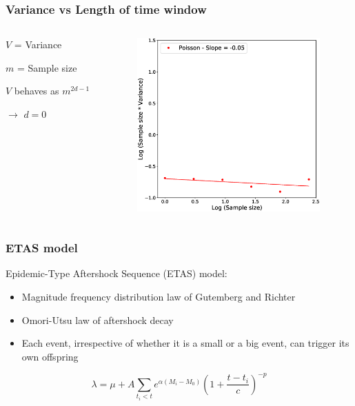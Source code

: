 \documentclass{beamer}
\begin{document}
	\begin{frame}
		\frametitle{Variance vs Length of time window}
		\begin{columns}[c]
			\begin{column}{4cm}
				$V$ = Variance

				\vspace{1em}

				$m$ = Sample size

				\vspace{1em}

				$V$ behaves as $m^{2 d - 1}$

				\vspace{1em}

				$\rightarrow$ $d =  0$
			\end{column}
			\begin{column}{7cm}
				\begin{center}
					\includegraphics[width=7cm, trim={0cm 1cm 2cm 2cm}, clip]{longrange/comparison_1.eps}
				\end{center}
			\end{column}
		\end{columns}
	\end{frame}

	\begin{frame}
		\frametitle{ETAS model}
		Epidemic-Type Aftershock Sequence (ETAS) model:
		\begin{itemize}
			\item Magnitude frequency distribution law of Gutemberg and Richter
			\item Omori-Utsu law of aftershock decay
			\item Each event, irrespective of whether it is a small or a big event, can trigger its own offspring
		\end{itemize}
		\begin{equation*}
		\lambda = \mu + A \sum_{t_i < t} e^{\alpha \left( M_i - M_0 \right)} \left( 1 + \frac{t - t_i}{c} \right) ^{-p}
		\end{equation*}
	\end{frame}
\end{document}
